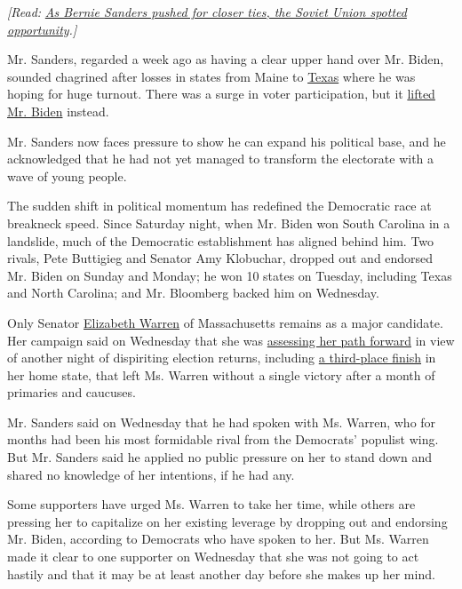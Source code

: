 \emph{{[}Read:}
\href{https://stela.nyt.net/url?url=http:\%2F\%2Fwww.nytimes.com\%2F2020\%2F03\%2F05\%2Fworld\%2Feurope\%2Fbernie-sanders-soviet-russia.html}{\emph{As
Bernie Sanders pushed for closer ties, the Soviet Union spotted
opportunity}}\emph{.{]}}

Mr. Sanders, regarded a week ago as having a clear upper hand over Mr.
Biden, sounded chagrined after losses in states from Maine to
\href{https://www.nytimes.com/2020/03/04/us/politics/joe-biden-texas-primary.html}{Texas}
where he was hoping for huge turnout. There was a surge in voter
participation, but it
\href{https://www.nytimes.com/2020/03/03/us/politics/super-tuesday-primary-winners.html}{lifted
Mr. Biden} instead.

Mr. Sanders now faces pressure to show he can expand his political base,
and he acknowledged that he had not yet managed to transform the
electorate with a wave of young people.

The sudden shift in political momentum has redefined the Democratic race
at breakneck speed. Since Saturday night, when Mr. Biden won South
Carolina in a landslide, much of the Democratic establishment has
aligned behind him. Two rivals, Pete Buttigieg and Senator Amy
Klobuchar, dropped out and endorsed Mr. Biden on Sunday and Monday; he
won 10 states on Tuesday, including Texas and North Carolina; and Mr.
Bloomberg backed him on Wednesday.

Only Senator
\href{https://www.nytimes.com/interactive/2020/us/elections/elizabeth-warren.html}{Elizabeth
Warren} of Massachusetts remains as a major candidate. Her campaign said
on Wednesday that she was
\href{https://www.nytimes.com/2020/03/04/us/politics/elizabeth-warren-democratic-primary.html?action=click\&module=Top\%20Stories\&pgtype=Homepage}{assessing
her path forward} in view of another night of dispiriting election
returns, including
\href{https://www.nytimes.com/interactive/2020/03/03/us/elections/results-massachusetts-president-democrat-primary-election.html}{a
third-place finish} in her home state, that left Ms. Warren without a
single victory after a month of primaries and caucuses.

Mr. Sanders said on Wednesday that he had spoken with Ms. Warren, who
for months had been his most formidable rival from the Democrats'
populist wing. But Mr. Sanders said he applied no public pressure on her
to stand down and shared no knowledge of her intentions, if he had any.

Some supporters have urged Ms. Warren to take her time, while others are
pressing her to capitalize on her existing leverage by dropping out and
endorsing Mr. Biden, according to Democrats who have spoken to her. But
Ms. Warren made it clear to one supporter on Wednesday that she was not
going to act hastily and that it may be at least another day before she
makes up her mind.

